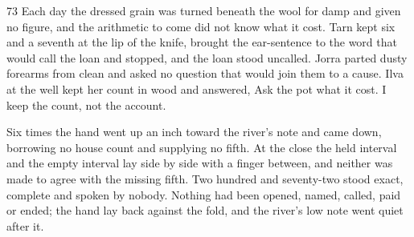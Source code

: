 \begin{CRchronicle}{73}
Each day the dressed grain was turned beneath the wool for damp and given no figure, and the arithmetic to come did not know what it cost. Tarn kept six and a seventh at the lip of the knife, brought the ear-sentence to the word that would call the loan and stopped, and the loan stood uncalled. Jorra parted dusty forearms from clean and asked no question that would join them to a cause. Ilva at the well kept her count in wood and answered, Ask the pot what it cost. I keep the count, not the account.

Six times the hand went up an inch toward the river’s note and came down, borrowing no house count and supplying no fifth. At the close the held interval and the empty interval lay side by side with a finger between, and neither was made to agree with the missing fifth. Two hundred and seventy-two stood exact, complete and spoken by nobody. Nothing had been opened, named, called, paid or ended; the hand lay back against the fold, and the river’s low note went quiet after it.
\end{CRchronicle}
